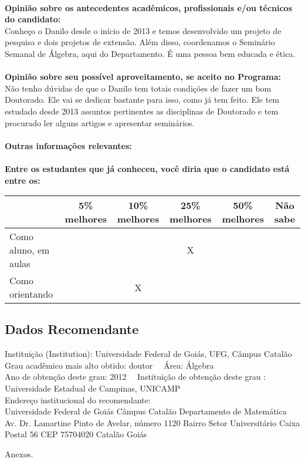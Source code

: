 \documentclass[11pt]{article}
\begin{document}
\\
\textbf{Opinião sobre os antecedentes acadêmicos, profissionais e/ou técnicos do candidato:}
\\Conheço o Danilo desde o início de 2013 e temos desenvolvido um projeto de pesquisa e dois projetos de extensão. Além disso, coordenamos o Seminário Semanal de Álgebra, aqui do Departamento. É uma pessoa bem educada e ética.\\
\\
\textbf{Opinião sobre seu possível aproveitamento, se aceito no Programa:}
\\Não tenho dúvidas de que o Danilo tem totais condições de fazer um bom Doutorado. Ele vai se dedicar bastante para isso, como já tem feito. Ele tem estudado desde 2013 assuntos pertinentes as disciplinas de Doutorado e tem procurado ler alguns artigos e apresentar seminários.\\ 
\\
\textbf{Outras informações relevantes:} \\
\\[0.3cm]
\textbf{Entre os estudantes que já conheceu, você diria que o candidato está entre os:}
\\
\begin{tabular}{|l|c|c|c|c|c|}
\hline
 & 5\% melhores & 10\% melhores & 25\% melhores & 50\% melhores & Não sabe \\
\hline
Como aluno, em aulas &  &  & X &  & \\
\hline
Como orientando &  & X &  &  & \\
\hline
\end{tabular}
\subsection*{Dados Recomendante} 
	Instituição (Institution): Universidade Federal de Goiás, UFG, Câmpus Catalão
\\ 
	Grau acadêmico mais alto obtido: doutor
	\ \ Área: Álgebra
	\\
	Ano de obtenção deste grau: 2012
	\ \ 
	Instituição de obtenção deste grau : Universidade Estadual de Campinas, UNICAMP
	\\ 
	Endereço institucional do recomendante: \\ Universidade Federal de Goiás
Câmpus Catalão
Departamento de Matemática
Av. Dr. Lamartine Pinto de Avelar, número 1120 
Bairro Setor Universitário
Caixa Postal 56
CEP 75704020
Catalão
Goiás 
\begin{center}
Anexos.
\end{center}
\end{document}
